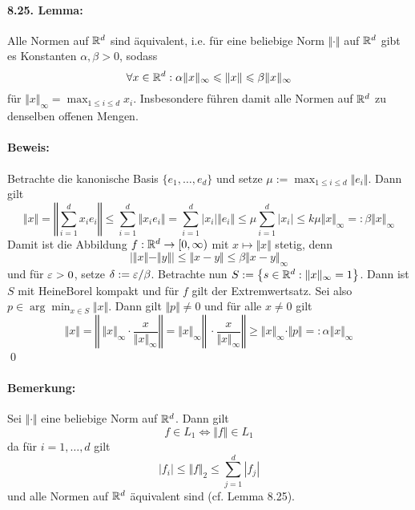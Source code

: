 \documentclass[11pt]{report}
\begin{document}
\paragraph{8.25. Lemma:}Alle Normen auf $\mathbb{R}^d$ sind \"aquivalent, i.e. f\"ur eine beliebige Norm $\Vert\cdot\Vert$ auf $\mathbb{R}^d$ gibt es Konstanten $\alpha,\beta>0$, sodass
$$\forall x\in\mathbb{R}^d:\alpha\Vert x\Vert_\infty\leqslant\Vert x\Vert\leqslant\beta\Vert x\Vert_\infty$$
f\"ur $\displaystyle\Vert x\Vert_\infty=\max_{1\leq i\leq d}x_i$. Insbesondere f\"uhren damit alle Normen auf $\mathbb{R}^d$ zu denselben offenen Mengen.

\paragraph{Beweis:}Betrachte die kanonische Basis $\{e_1,\hdots,e_d\}$ und setze $\displaystyle\mu:=\max_{1\leq i\leq d}\Vert e_i\Vert$. Dann gilt
$$\Vert x\Vert=\left\Vert\sum_{i=1}^d x_ie_i\right\Vert\leq\sum_{i=1}^d\Vert x_ie_i\Vert=\sum_{i=1}^d|x_i|\Vert e_i\Vert\leq\mu\sum_{i=1}^d|x_i|\leq k\mu\Vert x\Vert_\infty=:\beta\Vert x\Vert_\infty$$
Damit ist die Abbildung $f:\mathbb{R}^d\to[0,\infty)$ mit $x\mapsto\Vert x\Vert$ stetig, denn
$$\left|\Vert x\Vert-\Vert y\Vert\right|\leq\Vert x-y\Vert\leq\beta\Vert x-y\Vert_\infty$$ und f\"ur $\varepsilon>0$, setze $\delta:=\varepsilon/\beta$. Betrachte nun $S:=\left\{s\in\mathbb{R}^d:\Vert x\Vert_\infty=1\right\}$. Dann ist $S$ mit Heine\textendash Borel kompakt und f\"ur $f$ gilt der Extremwertsatz. Sei also $p\in\arg\min_{x\in S}\Vert x\Vert$. Dann gilt $\Vert p\Vert \neq0$ und f\"ur alle $x\neq0$ gilt
$$\Vert x\Vert=\left\Vert\ \Vert x\Vert_\infty\cdot\dfrac{x}{\Vert x\Vert_\infty} \right\Vert=\Vert x\Vert_\infty\left\Vert\ \cdot\dfrac{x}{\Vert x\Vert_\infty} \right\Vert\geq\Vert x\Vert_\infty\cdot\Vert p\Vert=:\alpha\Vert x\Vert_\infty$$
\qed

\paragraph{Bemerkung:}Sei $\Vert\cdot\Vert$ eine beliebige Norm auf $\mathbb{R}^d$. Dann gilt
$$f\in L_1\iff\Vert f\Vert\in L_1$$
da f\"ur $i=1,\hdots,d$ gilt
$$|f_i|\leq\Vert f\Vert_2\leq\sum_{j=1}^d|f_j|$$
und alle Normen auf $\mathbb{R}^d$ \"aquivalent sind (cf. Lemma 8.25).


\end{document}
